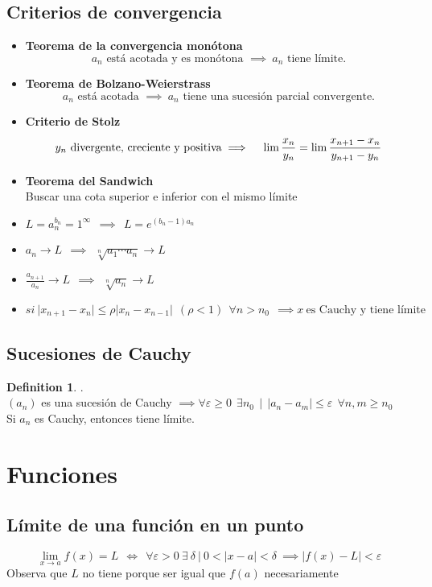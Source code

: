 \documentclass[12pt]{article}
\theoremstyle{plain}
\theoremstyle{definition}
\newtheorem{defn}{Definition}[section]
\theoremstyle{remark}
\begin{document}
\subsection{Criterios de convergencia}
\begin{itemize}
	\item \textbf{Teorema de la convergencia monótona}\\
	\[a_n \text{ está acotada y es monótona } \implies \ a_n \text{ tiene límite.}\]
	\item \textbf{Teorema de Bolzano-Weierstrass}\\
	\[a_n \text{ está acotada } \implies \ a_n \text{ tiene una sucesión parcial convergente.}\]
	\item \textbf{Criterio de Stolz}\\
	\[y_n \ \text{divergente, creciente y positiva\\
	   } \implies \ \ \ \lim \frac{x_n}{y_n}=\lim \frac{x_{n+1}-x_n}{y_{n+1}-y_n} \]   
	\item \textbf{Teorema del Sandwich}\\ Buscar una cota superior e inferior con el mismo límite			\item $L=a_n^{b_n}=1^\infty \ \ \implies \ \ L=e^{(b_n-1)a_n}$
	\item $a_n\to L \ \ \implies \ \ \sqrt[n]{a_1\cdots a_n}\to L$
	\item $\frac{a_{n+1}}{a_n}\to L \ \ \implies \ \ \sqrt[n]{a_n}\to L$
	\item $si \ \lvert x_{n+1}-x_n \rvert \leq \rho \lvert x_{n}-x_{n-1} \rvert \ \ (\rho<1) \ \ \forall n>n_0\ \ \implies x \ \text{es Cauchy y tiene límite}$
\end{itemize}

\subsection{Sucesiones de Cauchy}
\begin{defn}
	.\\
	$(a_n)$ es una sucesión de Cauchy $\implies \forall \varepsilon \geq 0 \ \ \exists n_0 \ \ | \ \ |a_n-a_m|\leq \varepsilon \ \ \forall n,m\geq n_0$\\
	Si $a_n$ es Cauchy, entonces tiene límite.
\end{defn}


\section{Funciones}
	\subsection{Límite de una función en un punto}
	\[\boxed{
	\lim_{x\to a}f(x)=L \ \ \iff \ \ \forall \varepsilon >0 \ \exists \ \delta \ | \ 0<\lvert x-a \rvert <\delta \ \implies \lvert f(x)-L\rvert <\varepsilon
	}\]
	Observa que $L$ no tiene porque ser igual que $f(a)$ necesariamente
\end{document}
